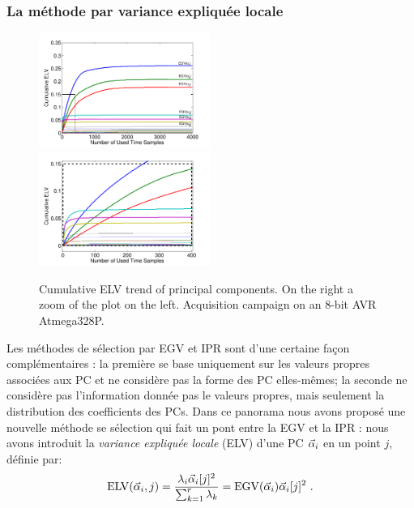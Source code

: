 %
\subsubsection{La méthode par variance expliquée locale} 
\begin{figure}
\includegraphics[width=0.5\textwidth]{figures/cumulativeELVallRectangle.pdf} 
\includegraphics[width=0.5\textwidth]{figures/cumulativeELVzoomedRectangle.pdf} 
\caption{Cumulative ELV trend of principal components. On the right a zoom of the plot on the left. Acquisition campaign on an 8-bit AVR Atmega328P.}\label{fig:ELVcumulative}
\end{figure}
%
Les méthodes de sélection par EGV et IPR sont d'une certaine façon complémentaires : la première se base uniquement sur les valeurs propres associées aux PC et ne considère pas la forme des PC elles-mêmes; la seconde ne considère pas l'information donnée pas le valeurs propres, mais seulement la distribution des coefficients des PCs. Dans ce panorama nous avons proposé une nouvelle méthode se sélection qui fait un pont entre la EGV et la IPR : nous avons introduit la \emph{variance expliquée locale} (ELV) d'une PC $\vec{\alpha}_i$ en un point $j$, définie par:
\begin{equation}
\mathrm{ELV}(\vec{\alpha}_i,j) = \frac{\lambda_i \vec{\alpha}_i[j]^2}{\sum_{k=1}^r\lambda_k} = \mathrm{EGV}(\vec{\alpha}_i) \vec{\alpha}_i[j]^2  \mbox{ .}
\end{equation}
